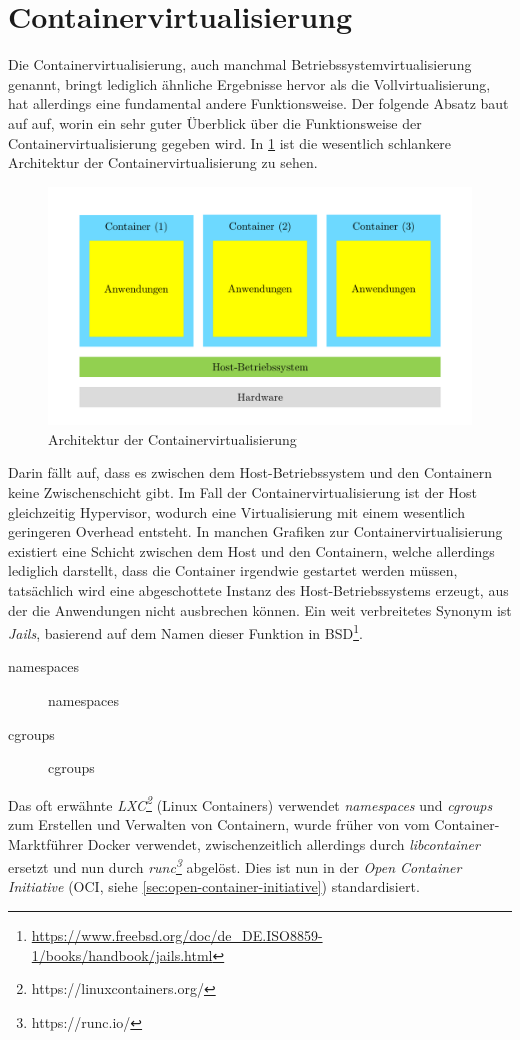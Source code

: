 \section{Containervirtualisierung}
\label{sec:containervirtualisierung}
Die Containervirtualisierung, auch manchmal Betriebssystemvirtualisierung genannt, bringt lediglich ähnliche Ergebnisse hervor als die Vollvirtualisierung, hat allerdings eine fundamental andere Funktionsweise.
Der folgende Absatz baut auf \autocite{EntwicklerDE2015} auf, worin ein sehr guter Überblick über die Funktionsweise der Containervirtualisierung gegeben wird.
In \cref{fig:architektur-containervirtualisierung} ist die wesentlich schlankere Architektur der Containervirtualisierung zu sehen.
\begin{figure}[htbp]
    \centering
    \includegraphics[width=0.9\linewidth,clip]{images/containervirtualisierung}
    \caption{Architektur der Containervirtualisierung}
    \label{fig:architektur-containervirtualisierung}
\end{figure}
Darin fällt auf, dass es zwischen dem Host-Betriebssystem und den Containern keine Zwischenschicht gibt.
Im Fall der Containervirtualisierung ist der Host gleichzeitig Hypervisor, wodurch eine Virtualisierung mit einem wesentlich geringeren Overhead entsteht.
In manchen Grafiken zur Containervirtualisierung existiert eine Schicht zwischen dem Host und den Containern, welche allerdings lediglich darstellt, dass die Container irgendwie gestartet werden müssen, tatsächlich wird eine abgeschottete Instanz des Host-Betriebssystems erzeugt, aus der die Anwendungen nicht ausbrechen können.
Ein weit verbreitetes Synonym ist \emph{Jails}, basierend auf dem Namen dieser Funktion in BSD\footnote{\url{https://www.freebsd.org/doc/de_DE.ISO8859-1/books/handbook/jails.html}}.
\begin{description}
    \item [namespaces] namespaces
    \item [cgroups] cgroups
\end{description}
Das oft erwähnte \emph{LXC\footnote{https://linuxcontainers.org/}} (Linux Containers) verwendet \emph{namespaces} und \emph{cgroups} zum Erstellen und Verwalten von Containern, wurde früher von vom Container-Marktführer Docker verwendet, zwischenzeitlich allerdings durch \emph{libcontainer} ersetzt und nun durch \emph{runc\footnote{https://runc.io/}} abgelöst.
Dies ist nun in der \emph{Open Container Initiative} (OCI, siehe \cref{sec:open-container-initiative}) standardisiert.

